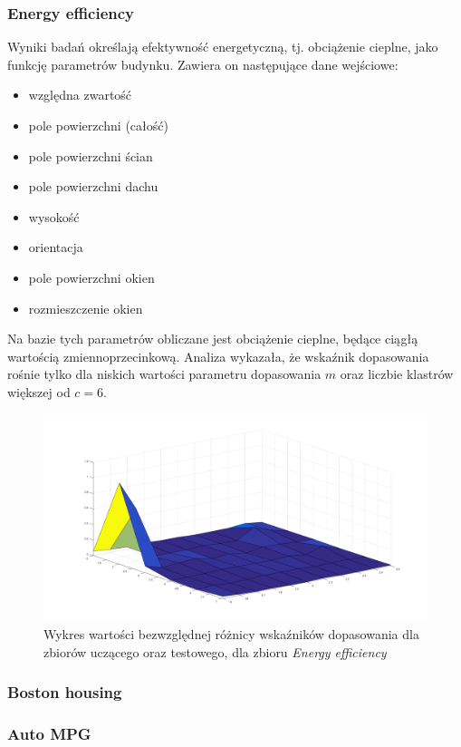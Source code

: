 \documentclass[a4paper; 11pt]{article}
\begin{document}
\subsubsection{Energy efficiency}
Wyniki badań określają efektywność energetyczną, tj. obciążenie cieplne, jako funkcję parametrów budynku.
Zawiera on następujące dane wejściowe:
\begin{itemize}
\item względna zwartość
\item pole powierzchni (całość)
\item pole powierzchni ścian
\item pole powierzchni dachu
\item wysokość
\item orientacja
\item pole powierzchni okien
\item rozmieszczenie okien
\end{itemize}
Na bazie tych parametrów obliczane jest obciążenie cieplne, będące ciągłą wartością zmiennoprzecinkową.
Analiza wykazała, że wskaźnik dopasowania rośnie tylko dla niskich wartości parametru dopasowania $m$ oraz
liczbie klastrów większej od $c = 6$. 

\begin{figure}
\begin{center}
\includegraphics{dq_energyeff.png}
\caption{Wykres wartości bezwzględnej różnicy wskaźników dopasowania dla zbiorów uczącego oraz testowego, dla zbioru \emph{Energy efficiency}}
\end{center}
\end{figure}

\subsubsection{Boston housing}
\subsubsection{Auto MPG}
\end{document}
